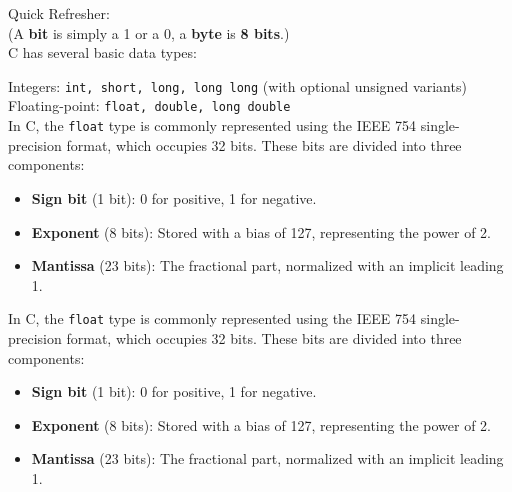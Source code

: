 \documentclass[a4paper,12pt]{article}
\begin{document}
Quick Refresher:\\
(A \textbf{bit} is simply a 1 or a 0, a \textbf{byte} is \textbf{8 bits}.)\\

C has several basic data types:

Integers: \verb|int, short, long, long long| (with optional unsigned variants)\\
Floating-point: \verb|float, double, long double|\\

In C, the \texttt{float} type is commonly represented using the IEEE 754 single-precision format, which occupies 32 bits. These bits are divided into three components:
\begin{itemize}
    \item \textbf{Sign bit} (1 bit): 0 for positive, 1 for negative.
    \item \textbf{Exponent} (8 bits): Stored with a bias of 127, representing the power of 2.
    \item \textbf{Mantissa} (23 bits): The fractional part, normalized with an implicit leading 1.
\end{itemize}

In C, the \texttt{float} type is commonly represented using the IEEE 754 single-precision format, which occupies 32 bits. These bits are divided into three components:
\begin{itemize}
    \item \textbf{Sign bit} (1 bit): 0 for positive, 1 for negative.
    \item \textbf{Exponent} (8 bits): Stored with a bias of 127, representing the power of 2.
    \item \textbf{Mantissa} (23 bits): The fractional part, normalized with an implicit leading 1.
\end{itemize}
\end{document}
